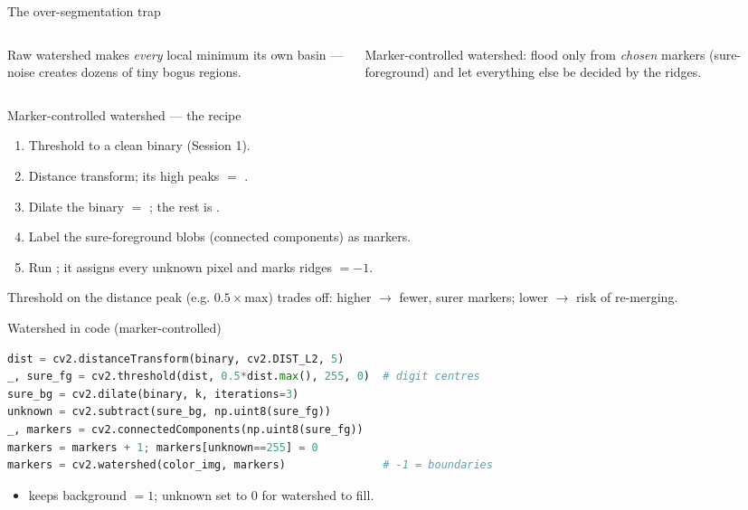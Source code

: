 \documentclass[10pt,aspectratio=169]{beamer}
\begin{document}
\begin{frame}{The over-segmentation trap}
  \begin{columns}[T]
    \begin{column}{0.5\textwidth}
      \begin{badbox}
        Raw watershed makes \emph{every} local minimum its own basin --- noise creates
        dozens of tiny bogus regions.
      \end{badbox}
    \end{column}
    \begin{column}{0.5\textwidth}
      \begin{goodbox}
        Marker-controlled watershed: flood only from \emph{chosen} markers
        (sure-foreground) and let everything else be decided by the ridges.
      \end{goodbox}
    \end{column}
  \end{columns}
\end{frame}

\begin{frame}{Marker-controlled watershed --- the recipe}
  \begin{enumerate}
    \item Threshold to a clean binary (Session 1).
    \item Distance transform; its high peaks $=$ .
    \item Dilate the binary $=$ ; the rest is .
    \item Label the sure-foreground blobs (connected components) as markers.
    \item Run ; it assigns every unknown pixel and marks ridges $=-1$.
  \end{enumerate}
  \begin{goodbox}
    Threshold on the distance peak (e.g. $0.5\times$max) trades off: higher $\to$ fewer,
    surer markers; lower $\to$ risk of re-merging.
  \end{goodbox}
\end{frame}

\begin{frame}[fragile]{Watershed in code (marker-controlled)}
\begin{lstlisting}[language=Python]
dist = cv2.distanceTransform(binary, cv2.DIST_L2, 5)
_, sure_fg = cv2.threshold(dist, 0.5*dist.max(), 255, 0)  # digit centres
sure_bg = cv2.dilate(binary, k, iterations=3)
unknown = cv2.subtract(sure_bg, np.uint8(sure_fg))
_, markers = cv2.connectedComponents(np.uint8(sure_fg))
markers = markers + 1; markers[unknown==255] = 0
markers = cv2.watershed(color_img, markers)               # -1 = boundaries
\end{lstlisting}
  \begin{itemize}
    \item {} keeps background $=1$; unknown set to $0$ for watershed to fill.
  \end{itemize}
\end{frame}
\end{document}
